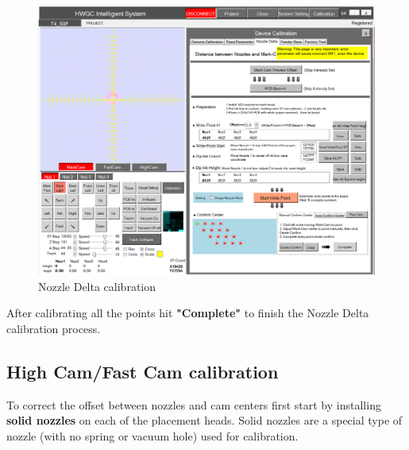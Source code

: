 \documentclass[a4paper,10pt]{report}
\begin{document}
 \begin{figure}[!htb]
 \centering
 \includegraphics[width=1\textwidth]{images/scrot37.png}
 \caption{Nozzle Delta calibration}
\end{figure}
After calibrating all the points hit \textbf{"Complete"} to finish the Nozzle Delta calibration process.
\newpage
\subsection{High Cam/Fast Cam calibration}
To correct the offset between nozzles and cam centers first start by installing \textbf{solid nozzles} on each of the placement heads. Solid nozzles are a special type of nozzle (with no spring or vacuum hole) used for calibration.\\
\end{document}
